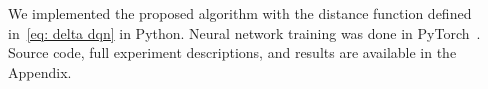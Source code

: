 \documentclass[letterpaper]{article} %
\begin{document}
We implemented the proposed algorithm with the distance function defined in~\cref{eq: delta dqn} in Python. %
Neural network training was done in PyTorch~\cite{paszke2015}.
Source code, full experiment descriptions, and results are available in the Appendix. 
\end{document}
